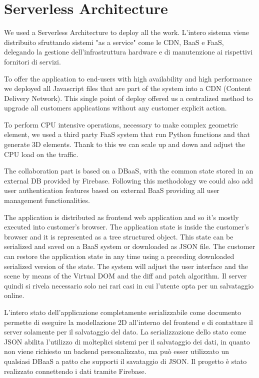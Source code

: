 \section{Serverless Architecture}\label{sec:architecture}

We used a Serverless Architecture to deploy all the work. L'intero sistema viene distribuito sfruttando sistemi "as a service" come le CDN, BaaS e FaaS, delegando la gestione dell'infrastruttura hardware e di manutenzione ai rispettivi fornitori di servizi.

To offer the application to end-users with high availability and high performance we deployed all Javascript files that are part of the system into a CDN (Content Delivery Network). This single point of deploy offered us a centralized method to upgrade all customers applications without any customer explicit action.

To perform CPU intensive operations, necessary to make complex geometric element, we used a third party FaaS system that run Python functions and that generate 3D elements. Thank to this we can scale up and down and adjust the CPU load on the traffic.

The collaboration part is based on a DBaaS, with the common state stored in an external DB provided by Firebase. Following this methodology we could also add user authentication features based on external BaaS providing all user management functionalities.

The application is distributed as frontend web application and so it's mostly executed into customer's browser. The application state is inside the customer's browser and it is represented as a tree structured object. This state can be serialized and saved on a BaaS system or downloaded as JSON file. The customer can restore the application state in any time using a preceding downloaded serialized version of the state. The system will adjust the user interface and the scene by means of the Virtual DOM and the diff and patch algorithm. Il server quindi si rivela necessario solo nei rari casi in cui l'utente opta per un salvataggio online.


L'intero stato dell'applicazione completamente serializzabile come documento permette di eseguire la modellazione 2D all'interno del frontend e di contattare il server solamente per il salvataggio del dato. La serializzazione dello stato come JSON  abilita l'utilizzo di molteplici sistemi per il salvataggio dei dati, in quanto non viene richiesto un backend personalizzato, ma può esser utilizzato un qualsiasi DBaaS a patto che supporti il savataggio di JSON. Il progetto è stato realizzato connettendo i dati tramite Firebase.

